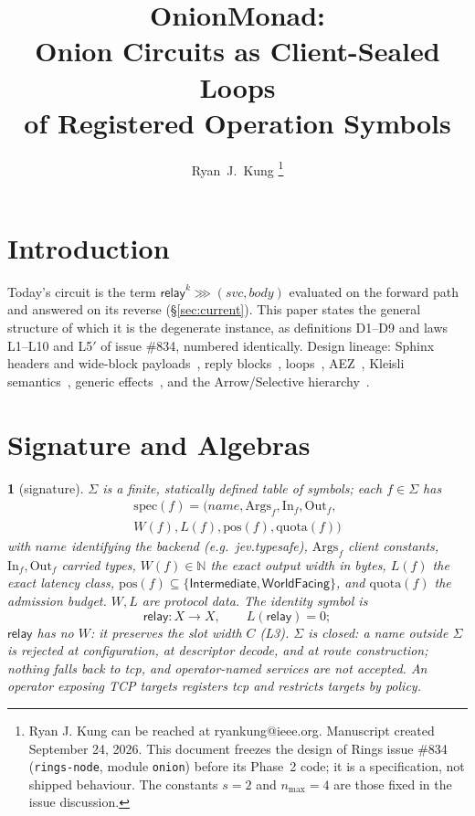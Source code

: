 \documentclass[journal]{IEEEtran}
\author{Ryan~J.~Kung%
\thanks{Ryan J. Kung can be reached at ryankung@ieee.org.
Manuscript created September 24, 2026.  This document freezes the design
of Rings issue \#834 (\texttt{rings-node}, module \texttt{onion}) before
its Phase~2 code; it is a specification, not shipped behaviour.  The
constants $s=2$ and $n_{\max}=4$ are those fixed in the issue discussion.}}
\title{\huge OnionMonad:\\
Onion Circuits as Client-Sealed Loops\\
of Registered Operation Symbols}
\date{}
\newcommand{\namedhead}{}
\newtheorem*{namedenv}{\namedhead}
\newenvironment{defD}[2]{\renewcommand{\namedhead}{Definition #1}%
  \begin{namedenv}[#2]}{\end{namedenv}}
\newcommand{\then}{\mathbin{\ggg}}
\newcommand{\relay}{\mathsf{relay}}
\newcommand{\Int}{\mathsf{Intermediate}}
\newcommand{\WF}{\mathsf{WorldFacing}}
\newcommand{\spec}{\mathrm{spec}}
\newcommand{\quota}{\mathrm{quota}}
\newcommand{\pos}{\mathrm{pos}}
\newcommand{\Args}{\mathrm{Args}}
\newcommand{\In}{\mathrm{In}}
\newcommand{\Out}{\mathrm{Out}}
\DeclareRobustCommand{\code}[1]{{\ttfamily\renewcommand{\_}{\textunderscore\allowbreak}#1}}
\begin{document}
\maketitle

\section{Introduction}

Today's circuit is the term $\relay^{k}\then(\mathit{svc},\mathit{body})$
evaluated on the forward path and answered on its reverse
(\S\ref{sec:current}).  This paper states the general structure of which
it is the degenerate instance, as definitions D1--D9 and laws L1--L10 and L5$'$
of issue \#834, numbered identically.  Design lineage: Sphinx headers and
wide-block payloads~\cite{Danezis2009}, reply blocks~\cite{Chaum1981,
Danezis2003}, loops~\cite{Piotrowska2017}, AEZ~\cite{Hoang2015}, Kleisli
semantics~\cite{Moggi1991}, generic effects~\cite{Plotkin2003,
Plotkin2009}, and the Arrow/Selective hierarchy~\cite{Hughes2000,
Lindley2011,Mokhov2019}.

\section{Signature and Algebras}\label{sec:sig}

\begin{defD}{D1}{signature}
$\Sigma$ is a finite, statically defined table of symbols; each $f\in\Sigma$
has
\begin{multline*}
\spec(f)=(\mathit{name},\Args_f,\In_f,\Out_f,\\
W(f),L(f),\pos(f),\quota(f))
\end{multline*}
with $\mathit{name}$ identifying the backend (e.g.\ \code{jev.typesafe}),
$\Args_f$ client constants, $\In_f,\Out_f$ carried types, $W(f)\in\mathbb{N}$
the exact output width in bytes, $L(f)$ the exact latency class,
$\pos(f)\subseteq\{\Int,\WF\}$, and $\quota(f)$ the admission budget.
$W,L$ are protocol data.  The identity symbol is
\[
\relay:X\to X,\qquad L(\relay)=0 ;
\]
$\relay$ has no $W$: it preserves the slot width $C$ (L3).  $\Sigma$ is
closed: a name outside $\Sigma$ is rejected at configuration, at
descriptor decode, and at route construction; nothing falls back to
\code{tcp}, and operator-named services are not accepted.  An operator
exposing TCP targets registers \code{tcp} and restricts targets by policy.
\end{defD}
\end{document}
